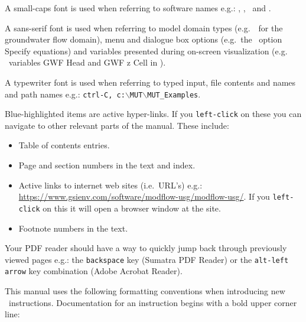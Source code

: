 A small-caps font is used when referring to software names e.g.: \mut, \mfus, \tecplot\ and \windows.

A sans-serif font is used when referring to model domain types (e.g.\ \gwf\ for the groundwater flow domain), menu and dialogue box options (e.g.\ the \tecplot\ option {\sf Specify equations}) and variables presented during on-screen visualization (e.g. \mut\ variables  {\sf GWF Head} and {\sf GWF z Cell} in \tecplot).

A typewriter font is used when referring to typed input, file contents and names  and path names e.g.: {\tt ctrl-C, c:$\backslash$MUT$\backslash$\-MUT\_Examples}.

Blue-highlighted items are active hyper-links.  If you {\tt left-click} on these you can navigate to other relevant parts of the manual.  These include:
\begin{itemize}
    \item Table of contents entries.
    \item Page and section numbers in the text and index.
    \item Active links to internet web sites (i.e.\ URL's) e.g.:  \url{https://www.gsienv.com/software/modflow-usg/modflow-usg/}.  If you {\tt left-click} on this it will open a browser window at the site.
    \item Footnote numbers in the text.
\end{itemize}
Your PDF reader should have a way to quickly jump back through previously viewed pages e.g.:  the {\tt backspace} key ({\sc Sumatra} PDF Reader) or the {\tt alt-left arrow} key combination ({\sc Adobe Acrobat Reader}).

This manual uses the following formatting conventions when introducing new \mut\ instructions. Documentation for an instruction begins with a bold upper corner line:

